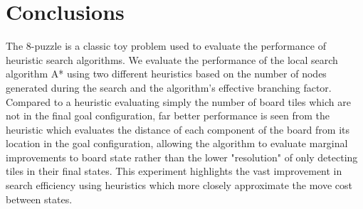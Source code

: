 
\section{Conclusions}
\label{sec:concl}

The 8-puzzle is a classic toy problem used to evaluate the performance of heuristic search algorithms.  We evaluate the performance of the local search algorithm A* using two different heuristics based on the number of nodes generated during the search and the algorithm's effective branching factor.  Compared to a heuristic evaluating simply the number of board tiles which are not in the final goal configuration, far better performance is seen from the heuristic which evaluates the distance of each component of the board from its location in the goal configuration, allowing the algorithm to evaluate marginal improvements to board state rather than the lower "resolution" of only detecting tiles in their final states.  This experiment highlights the vast improvement in search efficiency using heuristics which more closely approximate the move cost between states.


